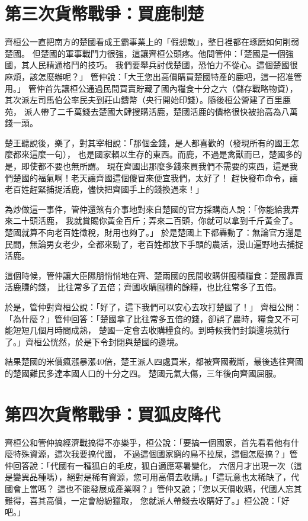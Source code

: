 \section{第三次貨幣戰爭：買鹿制楚}

齊桓公一直把南方的楚國看成王霸事業上的「假想敵」，整日裡都在琢磨如何削弱楚國。
但楚國的軍事戰鬥力很強，這讓齊桓公頭疼。他問管仲：「楚國是一個強國，其人民精通格鬥的技巧。
我們要舉兵討伐楚國，恐怕力不從心。這個楚國很麻煩，該怎麼辦呢？」
管仲說：「大王您出高價購買楚國特產的鹿吧，這一招准管用。」
管仲首先讓桓公通過民間買賣貯藏了國內糧食十分之六（儲存戰略物資），
其次派左司馬伯公率民夫到莊山鑄幣（央行開始印錢）。隨後桓公營建了百里鹿苑，
派人帶了二千萬錢去楚國大肆搜購活鹿，楚國活鹿的價格很快被抬高為八萬錢一頭。

楚王聽說後，樂了，對其宰相說：「那個金錢，是人都喜歡的（發現所有的國王怎麼都來這麼一句），
也是國家賴以生存的東西。而鹿，不過是禽獸而已，楚國多的是，即使都不要也無所謂。
現在齊國出那麼多錢來買我們不需要的東西，這是我們楚國的福氣啊！老天讓齊國這個傻冒來便宜我們，太好了！
趕快發布命令，讓老百姓趕緊捕捉活鹿，儘快把齊國手上的錢換過來！」

為炒做這一事件，管仲還煞有介事地對來自楚國的官方採購商人說：「你能給我弄來二十頭活鹿，
我就賞賜你黃金百斤；弄來二百頭，你就可以拿到千斤黃金了。楚國就算不向老百姓徵稅，財用也夠了。」
於是楚國上下都轟動了：無論官方還是民間，無論男女老少，全都來勁了，老百姓都放下手頭的農活，漫山遍野地去捕捉活鹿。

這個時候，管仲讓大臣隰朋悄悄地在齊、楚兩國的民間收購併囤積糧食：楚國靠賣活鹿賺的錢，
比往常多了五倍；齊國收購囤積的餘糧，也比往常多了五倍。

於是，管仲對齊桓公說：「好了，這下我們可以安心去攻打楚國了！」
齊桓公問：「為什麼？」管仲回答：「楚國拿了比往常多五倍的錢，卻誤了農時，糧食又不可能短短几個月時間成熟，
楚國一定會去收購糧食的。到時候我們封鎖邊境就行了。」齊桓公恍然，於是下令封閉與楚國的邊境。

結果楚國的米價瘋漲暴漲40倍，楚王派人四處買米，都被齊國截斷，最後逃往齊國的楚國難民多達本國人口的十分之四。
楚國元氣大傷，三年後向齊國屈服。

\section{第四次貨幣戰爭：買狐皮降代}
齊桓公和管仲搞經濟戰搞得不亦樂乎，桓公說：「要搞一個國家，首先看看他有什麼特殊資源，這次我要搞代國，
不過這個國家窮的鳥不拉屎，這個怎麼搞？」管仲回答說：「代國有一種狐白的毛皮，狐白適應寒暑變化，
六個月才出現一次（這是變異品種嗎），絕對是稀有資源，您可用高價去收購。」「這玩意也太稀缺了，代國會上當嗎？
這也不能發展成產業啊？」管仲又說；「您以天價收購，代國人忘其難得，喜其高價，一定會紛紛獵取，
您就派人帶錢去收購好了。」桓公說：「好吧。」

